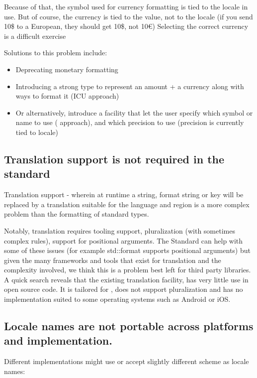 \documentclass{wg21}
\begin{document}
Because of that, the symbol used for currency formatting is tied to the locale in use.
But of course, the currency is tied to the value, not to the locale (if you send 10\$ to a European, they should get 10\$, not 10€)
Selecting the correct currency is a difficult exercise \cite{Stackoverflow}

Solutions to this problem include:

\begin{itemize}
    \item  Deprecating monetary formatting 
    \item Introducing a strong type to represent an amount + a currency along with ways to format it (ICU approach)
    \item Or alternatively, introduce a facility that let the user specify which symbol or name to use (\cite{QLocale} approach), and which precision to use (precision is currently tied to locale)
\end{itemize}

\subsection{Translation support is not required in the standard}

Translation support - wherein at runtime a string, format string or key will be replaced by a translation suitable for the language and region is a more complex problem than the formatting of standard types.

Notably, translation requires tooling support, pluralization (with sometimes complex rules), support for positional arguments.
The Standard can help with some of these issues (for example std::format supports positional arguments) but given the many frameworks and tools that exist for translation and the complexity involved, we think this is a problem best left for third party libraries.
A quick search reveals that the existing translation facility,  has very little use in open source code.
It is tailored for , does not support pluralization and has no implementation suited to some operating systems such as Android or iOS.


\subsection{Locale names are not portable across platforms and implementation.}

Different implementations might use or accept slightly different scheme as locale names:
\end{document}
